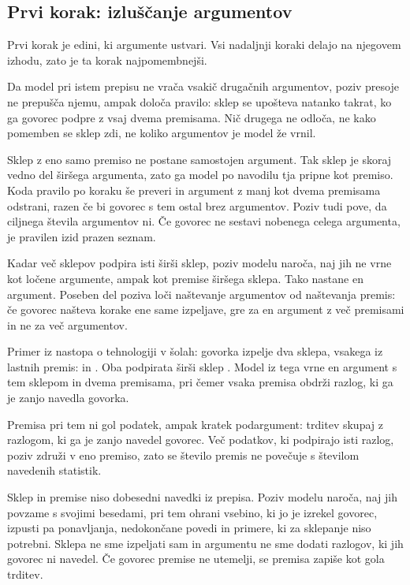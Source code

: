 \documentclass[a4paper, 12pt]{book}
\begin{document}
\subsection{Prvi korak: izluščanje argumentov}
\label{ssec:prehod1}

Prvi korak je edini, ki argumente ustvari. Vsi nadaljnji koraki delajo na njegovem izhodu, zato je ta korak najpomembnejši.

Da model pri istem prepisu ne vrača vsakič drugačnih argumentov, poziv presoje ne prepušča njemu, ampak določa pravilo: sklep se upošteva natanko takrat, ko ga govorec podpre z vsaj dvema premisama. Nič drugega ne odloča, ne kako pomemben se sklep zdi, ne koliko argumentov je model že vrnil.

Sklep z eno samo premiso ne postane samostojen argument. Tak sklep je skoraj vedno del širšega argumenta, zato ga model po navodilu tja pripne kot premiso. Koda pravilo po koraku še preveri in argument z manj kot dvema premisama odstrani, razen če bi govorec s tem ostal brez argumentov. Poziv tudi pove, da ciljnega števila argumentov ni. Če govorec ne sestavi nobenega celega argumenta, je pravilen izid prazen seznam.

Kadar več sklepov podpira isti širši sklep, poziv modelu naroča, naj jih ne vrne kot ločene argumente, ampak kot premise širšega sklepa. Tako nastane en argument. Poseben del poziva loči naštevanje argumentov od naštevanja premis: če govorec našteva korake ene same izpeljave, gre za en argument z več premisami in ne za več argumentov.

Primer iz nastopa o tehnologiji v šolah: govorka izpelje dva sklepa, vsakega iz lastnih premis:  in . Oba podpirata širši sklep . Model iz tega vrne en argument s tem sklepom in dvema premisama, pri čemer vsaka premisa obdrži razlog, ki ga je zanjo navedla govorka.

Premisa pri tem ni gol podatek, ampak kratek podargument: trditev skupaj z razlogom, ki ga je zanjo navedel govorec. Več podatkov, ki podpirajo isti razlog, poziv združi v eno premiso, zato se število premis ne povečuje s številom navedenih statistik.

Sklep in premise niso dobesedni navedki iz prepisa. Poziv modelu naroča, naj jih povzame s svojimi besedami, pri tem ohrani vsebino, ki jo je izrekel govorec, izpusti pa ponavljanja, nedokončane povedi in primere, ki za sklepanje niso potrebni. Sklepa ne sme izpeljati sam in argumentu ne sme dodati razlogov, ki jih govorec ni navedel. Če govorec premise ne utemelji, se premisa zapiše kot gola trditev.
\end{document}
